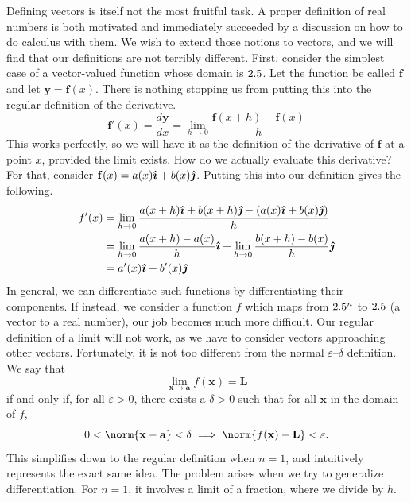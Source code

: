 \documentclass[a4paper,12pt]{article}
\begin{document}
\begin{appendices}
Defining vectors is itself not the most fruitful task.
A proper definition of real numbers is both motivated and immediately succeeded by a discussion on how to do calculus with them.
We wish to extend those notions to vectors, and we will find that our definitions are not terribly different.
First, consider the simplest case of a vector-valued function whose domain is $2.5$.
Let the function be called $\mathbf{f}$ and let $\mathbf{y} = \mathbf{f}(x)$.
There is nothing stopping us from putting this into the regular definition of the derivative.
\begin{equation*}
    \mathbf{f}'(x) = \frac{d\mathbf{y}}{dx} = \lim_{h \to 0} \frac{\mathbf{f}(x+h) - \mathbf{f}(x)}{h}
\end{equation*}
This works perfectly, so we will have it as the definition of the derivative of $\mathbf{f}$ at a point $x$, provided the limit exists.
How do we actually evaluate this derivative?
For that, consider $\mathbf{f}(x) = a(x)\text{\boldmath$\hat{\imath}$} + b(x)\text{\boldmath$\hat{\jmath}$}$.
Putting this into our definition gives the following.
\begin{align*}
    f'(x) &= \lim_{h \to 0} \frac{a(x+h)\text{\boldmath$\hat{\imath}$} + b(x+h)\text{\boldmath$\hat{\jmath}$} - (a(x)\text{\boldmath$\hat{\imath}$} + b(x)\text{\boldmath$\hat{\jmath}$})}{h} \\
    &= \lim_{h \to 0} \frac{a(x+h) - a(x)}{h}\text{\boldmath$\hat{\imath}$} + \lim_{h \to 0} \frac{b(x+h) - b(x)}{h}\text{\boldmath$\hat{\jmath}$} \\
    &= a'(x)\text{\boldmath$\hat{\imath}$} + b'(x)\text{\boldmath$\hat{\jmath}$}
\end{align*}
In general, we can differentiate such functions by differentiating their components.
If instead, we consider a function $f$ which maps from $2.5^n$ to $2.5$ (a vector to a real number), our job becomes much more difficult.
Our regular definition of a limit will not work, as we have to consider vectors approaching other vectors.
Fortunately, it is not too different from the normal $\varepsilon$--$\delta$ definition.
We say that
\begin{equation*}
    \lim_{\mathbf{x} \to \mathbf{a}} f(\mathbf{x}) = \mathbf{L}
\end{equation*}
if and only if, for all $\varepsilon > 0$, there exists a $\delta > 0$ such that for all $\mathbf{x}$ in the domain of $f$,
\begin{equation*}
    0 < \norm{\mathbf{x} - \mathbf{a}} < \delta \implies \norm{f(\mathbf{x}) - \mathbf{L}} < \varepsilon.
\end{equation*}
This simplifies down to the regular definition when $n=1$, and intuitively represents the exact same idea.
The problem arises when we try to generalize differentiation.
For $n=1$, it involves a limit of a fraction, where we divide by $h$.

\end{appendices}
\end{document}
